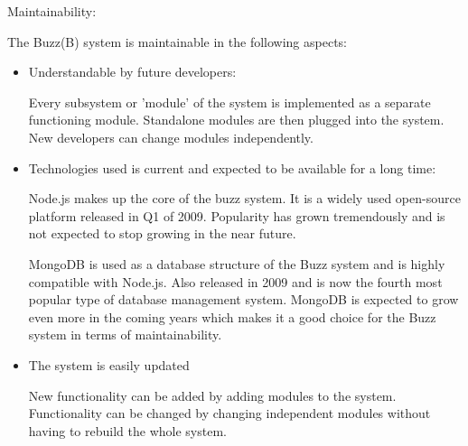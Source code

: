 \item Maintainability:

The Buzz(B) system is maintainable in the following aspects:

\begin{itemize}
\item Understandable by future developers:

Every subsystem or 'module' of the system is implemented as a separate functioning module.
Standalone modules are then plugged into the system.
New developers can change modules independently.
\item Technologies used is current and expected to be available for a long time:

Node.js makes up the core of the buzz system. It is a widely used open-source platform released in Q1 of 2009. Popularity has grown tremendously and is not expected to stop growing in the near future. 

MongoDB is used as a database structure of the Buzz system and is highly compatible with Node.js. Also released in 2009 and is now the fourth most popular type of database management system.  MongoDB is expected to grow even more in the coming years which makes it a good choice for the Buzz system in terms of maintainability.

\item The system is easily updated

New functionality can be added by adding modules to the system.
Functionality can be changed by changing independent modules without having to rebuild the whole system.
\end{itemize}